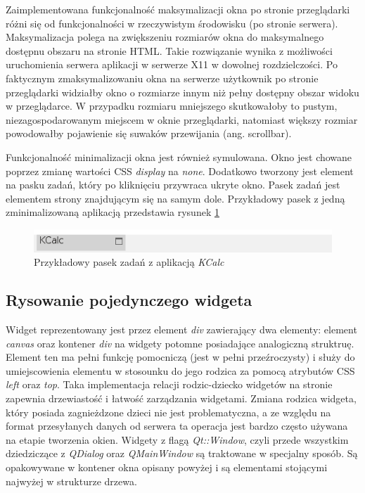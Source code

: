 Zaimplementowana funkcjonalność maksymalizacji okna po stronie przeglądarki różni się od funkcjonalności w rzeczywistym środowisku (po stronie serwera). Maksymalizacja polega na zwiększeniu rozmiarów okna do maksymalnego dostępnu obszaru na stronie HTML.
Takie rozwiązanie wynika z możliwości uruchomienia serwera aplikacji w serwerze X11 w dowolnej rozdzielczości. Po faktycznym zmaksymalizowaniu okna na serwerze użytkownik po stronie przeglądarki widziałby okno o rozmiarze innym niż pełny dostępny obszar widoku w przeglądarce. W przypadku rozmiaru mniejszego skutkowałoby to pustym, niezagospodarowanym miejscem w oknie przeglądarki, natomiast większy rozmiar powodowałby pojawienie się suwaków przewijania (ang. scrollbar).

Funkcjonalność minimalizacji okna jest również symulowana. Okno jest chowane poprzez zmianę wartości CSS \emph{display} na \emph{none}. Dodatkowo tworzony jest element na pasku zadań, który po kliknięciu przywraca ukryte okno. Pasek zadań jest elementem strony znajdującym się na samym dole. Przykładowy pasek z jedną zminimalizowaną aplikacją przedstawia rysunek \ref{fig:taskbar}

\begin{figure}
\centering
\includegraphics[width=0.7\linewidth]{img/taskbar}
\caption{Przykładowy pasek zadań z aplikacją \emph{KCalc}}
\label{fig:taskbar}
\end{figure}


\subsection{Rysowanie pojedynczego widgeta}
Widget reprezentowany jest przez element \emph{div} zawierający dwa elementy: element \emph{canvas} oraz kontener \emph{div} na widgety potomne posiadające analogiczną struktruę. Element ten ma pełni funkcję pomocniczą (jest w pełni przeźroczysty) i służy do umiejscowienia elementu w stosounku do jego rodzica za pomocą atrybutów CSS \emph{left} oraz \emph{top}. Taka implementacja relacji rodzic-dziecko widgetów na stronie zapewnia drzewiastość i łatwość zarządzania widgetami. Zmiana rodzica widgeta, który posiada zagnieżdzone dzieci nie jest problematyczna, a ze względu na format przesyłanych danych od serwera ta operacja jest bardzo często używana na etapie tworzenia okien.
Widgety z flagą \emph{Qt::Window}, czyli przede wszystkim dziedziczące z \emph{QDialog} oraz \emph{QMainWindow} są traktowane w specjalny sposób. Są opakowywane w kontener okna opisany powyżej i są elementami stojącymi najwyżej w strukturze drzewa.

